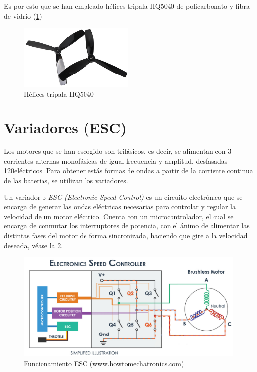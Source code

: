 Es por esto que se han empleado hélices tripala HQ5040 de policarbonato y fibra de vidrio (\cref{hardware:helice}).

\begin{figure}[htb!]
	\centering
	\includegraphics[width=0.5\textwidth]{hardware/helices.jpeg}
	\caption{Hélices tripala HQ5040}
	\label{hardware:helice}
\end{figure}

\section{Variadores (ESC)}


Los motores  que se han escogido son trifásicos, es decir, se alimentan con 3 corrientes alternas monofásicas de igual frecuencia y amplitud, desfasadas 120\grad \;eléctricos. Para obtener estás formas de ondas a partir de la corriente continua de las baterias, se utilizan los variadores.

Un variador o \textit{ESC (Electronic Speed Control)} es un circuito electrónico que se encarga de generar las ondas eléctricas necesarias para controlar y regular la velocidad de un motor eléctrico. Cuenta con un microcontrolador, el cual se encarga de conmutar los interruptores de potencia, con el ánimo de alimentar las distintas fases del motor de forma sincronizada, haciendo que gire a la velocidad deseada, véase la \cref{hardware:esc_explicacion}.
\begin{figure}[htb!]
	\centering
	\includegraphics[width=0.6\textheight]{hardware/howtomecatronics}
	\caption{Funcionamiento ESC (www.howtomechatronics.com)}
	\label{hardware:esc_explicacion}
\end{figure}

